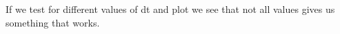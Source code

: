 \documentclass[norsk,a4paper,12pt]{article}
\begin{document}
\begin{figure}[H]
  \begin{center}
  \end{center}
 \caption{\textit{ }}
  \label{fig:edge}
\end{figure}

If we test for different values of dt and plot we see that not all values gives us something that works. 
\end{document}
